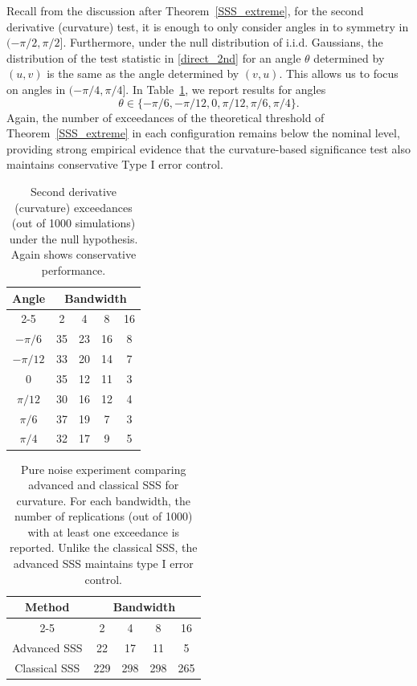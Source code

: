 \documentclass{article}
\begin{document}
Recall from the discussion after Theorem~\ref{SSS_extreme}, for the second derivative (curvature) test, it is enough to only consider angles in to  symmetry in $(-\pi/2, \pi/2]$. Furthermore, under the null distribution of i.i.d. Gaussians, the distribution of  the test statistic in \eqref{direct_2nd} for an angle $\theta$ determined by $(u,v)$ is the same as the angle determined by $(v,u)$. This allows us to focus on angles in $(-\pi/4, \pi/4]$. In Table~\ref{sim_2nd}, we  report results for angles 
\[
\theta \in \{-\pi/6, -\pi/12, 0, \pi/12, \pi/6, \pi/4\}.
\]
Again, the number of exceedances of the theoretical threshold of Theorem~\ref{SSS_extreme} in each configuration remains below the nominal level, providing strong empirical evidence that the curvature-based significance test also maintains conservative Type I error control.

\begin{table}[htbp]
	\centering
	\caption{Second derivative (curvature)  exceedances (out of 1000 simulations)  under the null hypothesis. Again shows conservative performance. }
	\label{sim_2nd}
	\begin{tabular}{|c|c|c|c|c|}
		\hline
		\multirow{2}{*}{Angle} &\multicolumn{4}{c|}{Bandwidth}    \\
		\cline{2-5}
		&2&4&8&16    \\
		\hline
		$-\pi/6$&35&23&16&8\\
		\hline
		$-\pi/12$&33&20&14&7\\
		\hline
		0&35&12&11&3\\
		\hline
		$\pi/12$&30&16&12&4\\
		\hline
		$\pi/6$&37&19&7&3\\
		\hline
		$\pi/4$&32&17&9&5\\
		\hline
	\end{tabular}
\end{table}

\begin{table}[htbp]
	\centering
	\caption{Pure noise experiment comparing advanced and classical SSS for curvature. For each bandwidth, the  number of replications (out of 1000) with at least one exceedance is reported. Unlike the classical SSS, the advanced SSS maintains type I error control.}
	\label{sim_2nd_corr}
	\begin{tabular}{|c|c|c|c|c|}
		\hline
		\multirow{2}{*}{Method} &\multicolumn{4}{c|}{Bandwidth}    \\
		\cline{2-5}
		&2&4&8&16    \\
		\hline
		Advanced SSS&22&17&11&5\\
		\hline
		Classical SSS&229&298&298&265\\
		\hline
	\end{tabular}
\end{table} 
\end{document}
